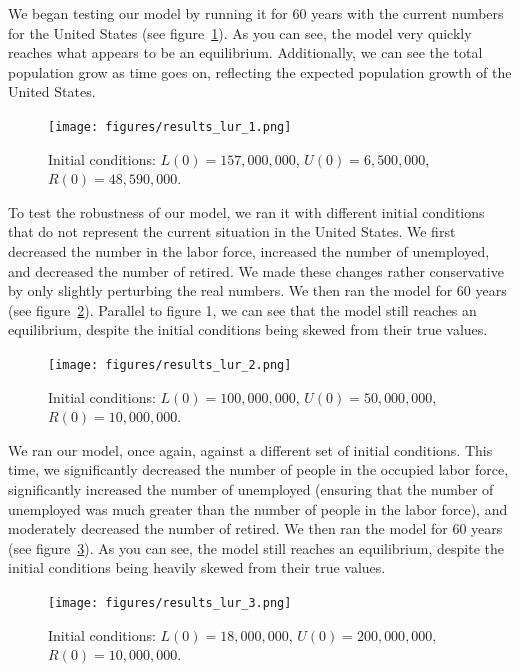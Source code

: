 \documentclass[11pt]{amsart}
\begin{document}
We began testing our model by running it for 60 years with the current numbers for the United States (see figure~\ref{fig:results_lur_1}). As you can see,
the model very quickly reaches what appears to be an equilibrium. Additionally, we can see the total population grow as time goes on, reflecting the expected population growth of the United States.

\begin{figure}[h]
    \centering
    \texttt{[image: figures/results\_lur\_1.png]}
    \caption{Initial conditions: $L(0) = 157,000,000$, $U(0) = 6,500,000$, $R(0) = 48,590,000$.}
    \label{fig:results_lur_1}
\end{figure}

To test the robustness of our model, we ran it with different initial conditions that do not represent the current situation in the United States. 
We first decreased the number in the labor force, increased the number of unemployed, and decreased the number of retired. We made these changes rather conservative
by only slightly perturbing the real numbers. We then ran the model for 60 years (see figure~\ref{fig:results_lur_2}).
Parallel to figure 1, we can see that the model still reaches an equilibrium, despite the initial conditions being skewed from their true values.

\begin{figure}[h]
    \centering
    \texttt{[image: figures/results\_lur\_2.png]}
    \caption{Initial conditions: $L(0) = 100,000,000$, $U(0) = 50,000,000$, $R(0) = 10,000,000$.}
    \label{fig:results_lur_2}
\end{figure}

\newpage


We ran our model, once again, against a different set of initial conditions. This time, we significantly decreased the number of people in the occupied
labor force, significantly increased the number of unemployed (ensuring that the number of unemployed was much greater than the number of people in the labor force), and moderately decreased the number of retired. We then ran the model for 60 years (see figure~\ref{fig:results_lur_3}).
As you can see, the model still reaches an equilibrium, despite the initial conditions being heavily skewed from their true values.

\begin{figure}[h]
    \centering
    \texttt{[image: figures/results\_lur\_3.png]}
    \caption{Initial conditions: $L(0) = 18,000,000$, $U(0) = 200,000,000$, $R(0) = 10,000,000$.}
    \label{fig:results_lur_3}
\end{figure}
\end{document}
